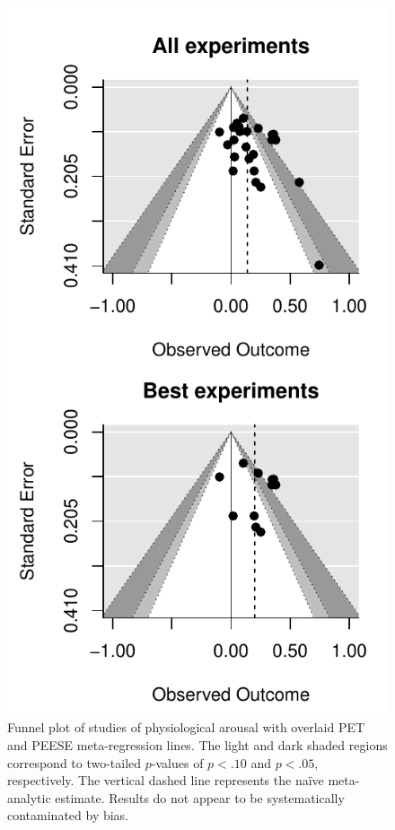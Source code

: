 \documentclass[man]{apa6}
\begin{document}
\begin{figure}
	\includegraphics{funnels-0_PhysArous.pdf}
	\caption{Funnel plot of studies of physiological arousal with overlaid PET and PEESE meta-regression lines. The light and dark shaded regions correspond to two-tailed $p$-values of $p < .10$ and $p < .05$, respectively. The vertical dashed line represents the na{\"i}ve meta-analytic estimate. Results do not appear to be systematically contaminated by bias.}
	\label{funnel-physarous}
\end{figure}
\end{document}
